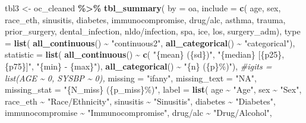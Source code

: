 \documentclass[
]{article}
\newenvironment{Shaded}{\begin{snugshade}}{\end{snugshade}}
\newcommand{\AttributeTok}[1]{\textcolor[rgb]{0.13,0.29,0.53}{#1}}
\newcommand{\CommentTok}[1]{\textcolor[rgb]{0.56,0.35,0.01}{\textit{#1}}}
\newcommand{\FunctionTok}[1]{\textcolor[rgb]{0.13,0.29,0.53}{\textbf{#1}}}
\newcommand{\NormalTok}[1]{#1}
\newcommand{\OtherTok}[1]{\textcolor[rgb]{0.56,0.35,0.01}{#1}}
\newcommand{\SpecialCharTok}[1]{\textcolor[rgb]{0.81,0.36,0.00}{\textbf{#1}}}
\newcommand{\StringTok}[1]{\textcolor[rgb]{0.31,0.60,0.02}{#1}}
\begin{document}
\begin{Shaded}
\begin{Highlighting}[]
\NormalTok{tbl3 }\OtherTok{\textless{}{-}}\NormalTok{ oc\_cleaned }\SpecialCharTok{\%\textgreater{}\%}
  \FunctionTok{tbl\_summary}\NormalTok{(}
    \AttributeTok{by =}\NormalTok{ oa,}
    \AttributeTok{include =} \FunctionTok{c}\NormalTok{(}
\NormalTok{      age, sex, race\_eth, sinusitis, diabetes, immunocompromise, }\StringTok{\textasciigrave{}}\AttributeTok{drug/alc}\StringTok{\textasciigrave{}}\NormalTok{,}
\NormalTok{      asthma, trauma, prior\_surgery, dental\_infection, }\StringTok{\textasciigrave{}}\AttributeTok{nldo/infection}\StringTok{\textasciigrave{}}\NormalTok{, }
\NormalTok{      spa, ice, los, surgery\_adm),}
    \AttributeTok{type =} \FunctionTok{list}\NormalTok{(}
      \FunctionTok{all\_continuous}\NormalTok{() }\SpecialCharTok{\textasciitilde{}} \StringTok{"continuous2"}\NormalTok{,}
      \FunctionTok{all\_categorical}\NormalTok{() }\SpecialCharTok{\textasciitilde{}} \StringTok{"categorical"}\NormalTok{),}
    \AttributeTok{statistic =} \FunctionTok{list}\NormalTok{(}
      \FunctionTok{all\_continuous}\NormalTok{() }\SpecialCharTok{\textasciitilde{}} \FunctionTok{c}\NormalTok{(}
        \StringTok{"\{mean\} (\{sd\})"}\NormalTok{,}
        \StringTok{"\{median\} [\{p25\}, \{p75\}]"}\NormalTok{,}
        \StringTok{"\{min\} {-} \{max\}"}\NormalTok{),}
      \FunctionTok{all\_categorical}\NormalTok{() }\SpecialCharTok{\textasciitilde{}} \StringTok{"\{n\} (\{p\}\%)"}\NormalTok{),}
    \CommentTok{\#igits = list(AGE \textasciitilde{} 0, SYSBP \textasciitilde{} 0),}
    \AttributeTok{missing =} \StringTok{"ifany"}\NormalTok{,}
    \AttributeTok{missing\_text =} \StringTok{"NA"}\NormalTok{,}
    \AttributeTok{missing\_stat =} \StringTok{"\{N\_miss\} (\{p\_miss\}\%)"}\NormalTok{,}
    \AttributeTok{label =} \FunctionTok{list}\NormalTok{(}
\NormalTok{      age }\SpecialCharTok{\textasciitilde{}} \StringTok{"Age"}\NormalTok{,}
\NormalTok{      sex }\SpecialCharTok{\textasciitilde{}} \StringTok{"Sex"}\NormalTok{,}
\NormalTok{      race\_eth }\SpecialCharTok{\textasciitilde{}} \StringTok{"Race/Ethnicity"}\NormalTok{,}
\NormalTok{      sinusitis }\SpecialCharTok{\textasciitilde{}} \StringTok{"Sinusitis"}\NormalTok{,}
\NormalTok{      diabetes }\SpecialCharTok{\textasciitilde{}} \StringTok{"Diabetes"}\NormalTok{,}
\NormalTok{      immunocompromise }\SpecialCharTok{\textasciitilde{}} \StringTok{"Immunocompromise"}\NormalTok{,}
      \StringTok{\textasciigrave{}}\AttributeTok{drug/alc}\StringTok{\textasciigrave{}} \SpecialCharTok{\textasciitilde{}} \StringTok{"Drug/Alcohol"}\NormalTok{,}

\end{Highlighting}
\end{Shaded}
\end{document}
